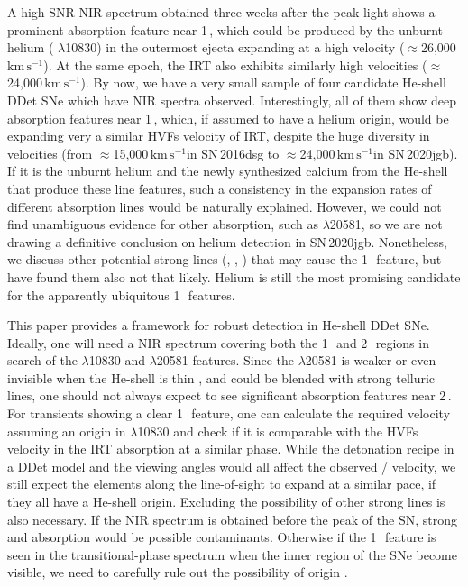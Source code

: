 \documentclass[twocolumn]{aastex631}
\newcommand{\sn}{SN\,2020jgb}
\newcommand{\kms}{$\mathrm{km}\,\mathrm{s}^{-1}$}
\begin{document}
A high-SNR NIR spectrum obtained three weeks after the peak light shows a prominent absorption feature near 1\,\micron, which could be produced by the unburnt helium ( $\lambda$10830) in the outermost ejecta expanding at a high velocity ($\approx$26,000\,\kms). At the same epoch, the  IRT also exhibits similarly high velocities ($\approx$24,000\,\kms). By now, we have a very small sample of four candidate He-shell DDet SNe which have NIR spectra observed. Interestingly, all of them show deep absorption features near 1\,\micron, which, if assumed to have a helium origin, would be expanding very a similar HVFs velocity of  IRT, despite the huge diversity in velocities (from $\approx$15,000\,\kms in SN\,2016dsg to $\approx$24,000\,\kms in \sn). If it is the unburnt helium and the newly synthesized calcium from the He-shell that produce these line features, such a consistency in the expansion rates of different absorption lines would be naturally explained. However, we could not find unambiguous evidence for other  absorption, such as  $\lambda$20581, so we are not drawing a definitive conclusion on helium detection in \sn. Nonetheless, we discuss other potential strong lines (, , ) that may cause the 1\,\micron\ feature, but have found them also not that likely. Helium is still the most promising candidate for the apparently ubiquitous 1\,\micron\ features.

This paper provides a framework for robust  detection in He-shell DDet SNe. 
Ideally, one will need a NIR spectrum covering both the 1\,\micron\ and 2\,\micron\ regions in search of the  $\lambda$10830 and $\lambda$20581 features. Since the  $\lambda$20581 is weaker or even invisible when the He-shell is thin \citep{Boyle2017_Helium}, and could be blended with strong telluric lines, one should not always expect to see significant absorption features near 2\,\micron. For transients showing a clear 1\,\micron\ feature, one can calculate the required velocity assuming an origin in  $\lambda$10830 and check if it is comparable with the HVFs velocity in the  IRT absorption at a similar phase. While the detonation recipe in a DDet model and the viewing angles would all affect the observed / velocity, we still expect the elements along the line-of-sight to expand at a similar pace, if they all have a He-shell origin. Excluding the possibility of other strong lines is also necessary. If the NIR spectrum is obtained before the peak of the SN, strong  and  absorption \citep{Hsiao_CSP_2019} would be possible contaminants. Otherwise if the 1\,\micron\ feature is seen in the transitional-phase spectrum when the inner region of the SNe become visible, we need to carefully rule out the possibility of  origin \citep{Marion2009_NIR}.
\end{document}
